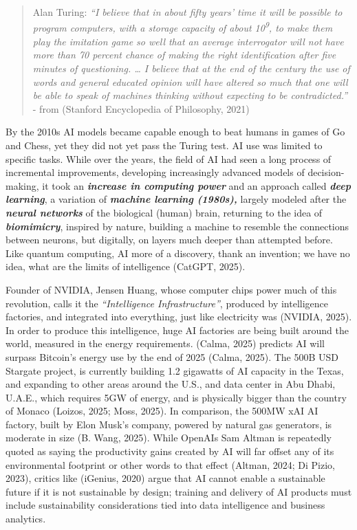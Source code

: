 \documentclass[
  letterpaper,
  DIV=11,
  numbers=noendperiod]{scrartcl}
\begin{document}
\begin{quote}
Alan Turing: \emph{``I believe that in about fifty years' time it will
be possible to program computers, with a storage capacity of about
10\textsuperscript{9}, to make them play the imitation game so well that
an average interrogator will not have more than 70 percent chance of
making the right identification after five minutes of questioning.
\ldots{} I believe that at the end of the century the use of words and
general educated opinion will have altered so much that one will be able
to speak of machines thinking without expecting to be contradicted.''} -
from (Stanford Encyclopedia of Philosophy, 2021)
\end{quote}

By the 2010s AI models became capable enough to beat humans in games of
Go and Chess, yet they did not yet pass the Turing test. AI use was
limited to specific tasks. While over the years, the field of AI had
seen a long process of incremental improvements, developing increasingly
advanced models of decision-making, it took an \textbf{\emph{increase in
computing power}} and an approach called \textbf{\emph{deep learning}},
a variation of \textbf{\emph{machine learning (1980s),}} largely modeled
after the \textbf{\emph{neural networks}} of the biological (human)
brain, returning to the idea of \textbf{\emph{biomimicry}}, inspired by
nature, building a machine to resemble the connections between neurons,
but digitally, on layers much deeper than attempted before. Like quantum
computing, AI more of a discovery, thank an invention; we have no idea,
what are the limits of intelligence (CatGPT, 2025).

Founder of NVIDIA, Jensen Huang, whose computer chips power much of this
revolution, calls it the \emph{``Intelligence Infrastructure''},
produced by intelligence factories, and integrated into everything, just
like electricity was (NVIDIA, 2025). In order to produce this
intelligence, huge AI factories are being built around the world,
measured in the energy requirements. (Calma, 2025) predicts AI will
surpass Bitcoin's energy use by the end of 2025 (Calma, 2025). The 500B
USD Stargate project, is currently building 1.2 gigawatts of AI capacity
in the Texas, and expanding to other areas around the U.S., and data
center in Abu Dhabi, U.A.E., which requires 5GW of energy, and is
physically bigger than the country of Monaco (Loizos, 2025; Moss, 2025).
In comparison, the 500MW xAI AI factory, built by Elon Musk's company,
powered by natural gas generators, is moderate in size (B. Wang, 2025).
While OpenAIs Sam Altman is repeatedly quoted as saying the productivity
gains created by AI will far offset any of its environmental footprint
or other words to that effect (Altman, 2024; Di Pizio, 2023), critics
like (iGenius, 2020) argue that AI cannot enable a sustainable future if
it is not sustainable by design; training and delivery of AI products
must include sustainability considerations tied into data intelligence
and business analytics.
\end{document}
